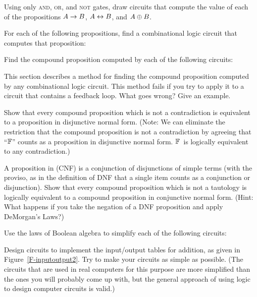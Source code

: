 \begin{exercises}

\problem Using only \textsc{and}, \textsc{or}, and \textsc{not} gates,
draw circuits that compute the value of each of the propositions
$A\rightarrow B$, $A\leftrightarrow B$, and $A\oplus B$.

\problem For each of the following propositions, find a combinational
logic circuit that computes that proposition:

\problem Find the compound proposition computed by each of the
following circuits:
\medskip

\centerline{\qquad{}}

\problem This section describes a method for finding the compound
proposition computed by any combinational logic circuit.  This method
fails if you try to apply it to a circuit that contains a feedback loop.
What goes wrong?  Give an example.

\problem Show that every compound proposition which is not a contradiction
is equivalent to a proposition in disjunctive normal form.  (Note: We can
eliminate the restriction that the compound proposition is not a
contradiction by agreeing that ``$\mathbb{F}$'' counts as a proposition in
disjunctive normal form.  $\mathbb{F}$~is logically equivalent to any contradiction.)

\problem\label{ex:CNF}A proposition in  (CNF) is
a conjunction of disjunctions of simple terms (with the proviso, as 
in the definition of DNF that a single item counts as a conjunction
or disjunction).  Show that every 
compound proposition which is not a tautology is logically equivalent
to a compound proposition in conjunctive normal form.  (Hint:
What happens if you take the negation of a DNF proposition and
apply DeMorgan's Laws?)

\problem Use the laws of Boolean algebra to simplify each of the
following circuits:
\medskip



\problem Design circuits to implement the input/output tables
for addition, as given in Figure~\ref{F-inputoutput2}.  Try to
make your circuits as simple as possible.  (The circuits that are
used in real computers for this purpose are more simplified than
the ones you will probably come up with, but the general approach
of using logic to design computer circuits is valid.)

\end{exercises}

